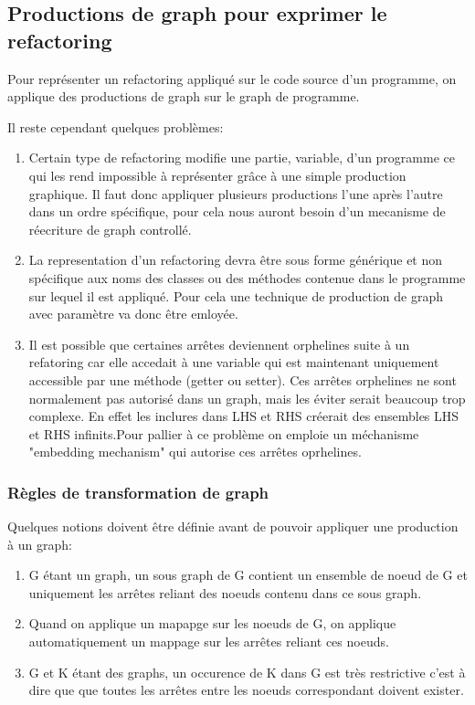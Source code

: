 \documentclass[a4paper, 12pt]{article}
\begin{document}
\subsection{Productions de graph pour exprimer le refactoring}

Pour représenter un refactoring appliqué sur le code source d'un programme, on applique des productions de graph sur le graph de programme.

Il reste cependant quelques problèmes:

\begin{enumerate}
\item Certain type de refactoring modifie une partie, variable, d'un programme ce qui les rend impossible à représenter grâce à une simple production graphique. Il faut donc appliquer plusieurs productions l'une après l'autre dans un ordre spécifique, pour cela nous auront besoin d'un mecanisme de réecriture de graph controllé.

\item La representation d'un refactoring devra être sous forme générique et non spécifique aux noms des classes ou des méthodes contenue dans le programme sur lequel il est appliqué. Pour cela une technique de production de graph avec paramètre va donc être emloyée. 

\item Il est possible que certaines arrêtes deviennent orphelines suite à un refatoring car elle accedait à une variable qui est maintenant uniquement accessible par une méthode (getter ou setter). Ces arrêtes orphelines ne sont normalement pas autorisé dans un graph, mais les éviter serait beaucoup trop complexe. En effet les inclures dans LHS et RHS créerait des ensembles LHS et RHS infinits.Pour pallier à ce problème on emploie un méchanisme "embedding mechanism" qui autorise ces arrêtes oprhelines.
\end{enumerate}

\subsubsection{Règles de transformation de graph}

Quelques notions doivent être définie avant de pouvoir appliquer une production à un graph:

\begin{enumerate}
\item G étant un graph, un sous graph de G contient un ensemble de noeud de G et uniquement les arrêtes reliant des noeuds contenu dans ce sous graph. 

\item Quand on applique un mapapge sur les noeuds de G, on applique automatiquement un mappage sur les arrêtes reliant ces noeuds.

\item  G et K étant des graphs, un occurence de K dans G est très restrictive c'est à dire que que toutes les arrêtes entre les noeuds correspondant doivent exister. 
\end{enumerate}
\end{document}
